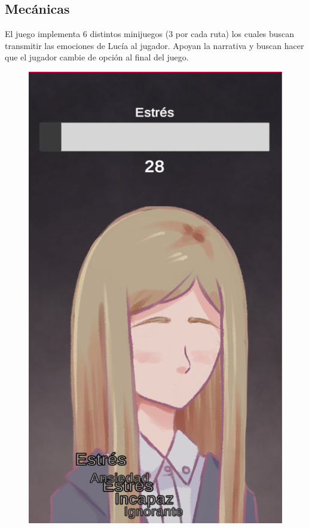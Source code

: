 \documentclass[12pt]{article}
\begin{document}
\subsection{Mecánicas}
El juego implementa 6 distintos minijuegos (3 por cada ruta) los cuales buscan transmitir las emociones de Lucía al jugador. Apoyan la narrativa y buscan hacer que el jugador cambie de opción al final del juego.

\begin{figure}[h]
    \centering
    \begin{minipage}{.15\textwidth}
        \includegraphics[width=\textwidth]{imgs/screenshot3.png}

\end{minipage}
\end{figure}
\end{document}
